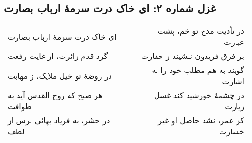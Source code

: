 \begin{center}
\section*{غزل شماره ۲: ای خاک درت سرمهٔ ارباب بصارت}
\label{sec:002}
\begin{longtable}{l p{0.5cm} r}
ای خاک درت سرمهٔ ارباب بصارت
&&
در تأدیت مدح تو خم، پشت عبارت
\\
گرد قدم زائرت، از غایت رفعت
&&
بر فرق فریدون ننشیند ز حقارت
\\
در روضهٔ تو خیل ملایک، ز مهابت
&&
گویند به هم مطلب خود را به اشارت
\\
هر صبح که روح القدس آید به طوافت
&&
در چشمهٔ خورشید کند غسل زیارت
\\
در حشر، به فریاد بهائی برس از لطف
&&
کز عمر، نشد حاصل او غیر خسارت
\\
\end{longtable}
\end{center}
